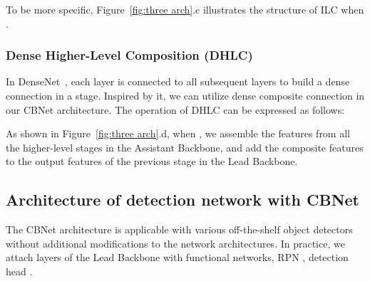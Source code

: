 \documentclass[letterpaper]{article} \usepackage{aaai20}  \usepackage{multirow}
\begin{document}
To be more specific, Figure~\ref{fig:three arch}.c illustrates the structure of ILC when .

\subsubsection{Dense Higher-Level Composition (DHLC)} 
In DenseNet~\cite{huang2017densely}, each layer is connected to all subsequent layers to build a dense connection in a stage. Inspired by it, we can utilize dense composite connection in our CBNet architecture. The operation of DHLC can be expressed as follows:

As shown in Figure~\ref{fig:three arch}.d, when ,
we assemble the features from all the higher-level stages in the Assistant Backbone, and add the composite features to the output features of the previous stage in the Lead Backbone.




\subsection{Architecture of detection network with CBNet }
\label{sec:det}
The CBNet architecture is applicable with various off-the-shelf object detectors without additional modifications to the network architectures.
In practice, we attach layers of the Lead Backbone with functional networks, RPN \cite{ren2015faster} , detection head \cite{Redmon_2016_CVPR,ren2015faster,zhang2018single,lin2017feature,he2017mask,cai18cascadercnn}.
\end{document}
